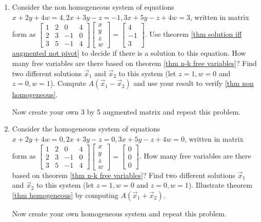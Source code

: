 \begin{enumerate}
\begin{enumerate}
	\item Consider the non homogeneous system of equations $x+2y+4w=4, 2x+3y-z=-1, 3x+5y-z+4w=3$, written in matrix form as 
	$
	\begin{bmatrix}
	1 & 2 & 0 & 4 \\
	2 & 3 & -1 & 0\\
	3 & 5 & -1 & 4	
	\end{bmatrix}
	\begin{bmatrix}
	x\\y\\z\\w	
	\end{bmatrix}
	=\begin{bmatrix}
	 4\\
	 -1\\
	 3	
	\end{bmatrix}
	$.  
	Use theorem \ref{thm solution iff augmented not pivot} to decide if there is a solution to this equation. 
	How many free variables are there based on theorem \ref{thm n-k free variables}? 
	Find two different solutions $\vec x_1$ and $\vec x_2$ to this system (let $z=1,w=0$ and $z=0,w=1$).  
	Compute $A(\vec x_1 - \vec x_2)$ and use your result to verify \ref{thm non homogeneous}. 
	
	Now create your own 3 by 5 augmented matrix and repeat this problem. 
	
	\item Consider the homogeneous system of equations $x+2y+4w=0, 2x+3y-z=0, 3x+5y-z+4w=0$, written in matrix form as 
	$
	\begin{bmatrix}
	1 & 2 & 0 & 4 \\
	2 & 3 & -1 & 0\\
	3 & 5 & -1 & 4	
	\end{bmatrix}
	\begin{bmatrix}
	x\\y\\z\\w	
	\end{bmatrix}
	=\begin{bmatrix}
	 0\\
	 0\\
	 0	
	\end{bmatrix}
	$.  
	How many free variables are there based on theorem \ref{thm n-k free variables}?
	Find two different solutions $\vec x_1$ and $\vec x_2$ to this system (let $z=1,w=0$ and $z=0,w=1$).  
	Illustrate theorem \ref{thm homogeneous} by computing $A(\vec x_1 + \vec x_2)$. 
	
	Now create your own homogeneous system and repeat this problem. 	
	

\end{enumerate}
\end{enumerate}
